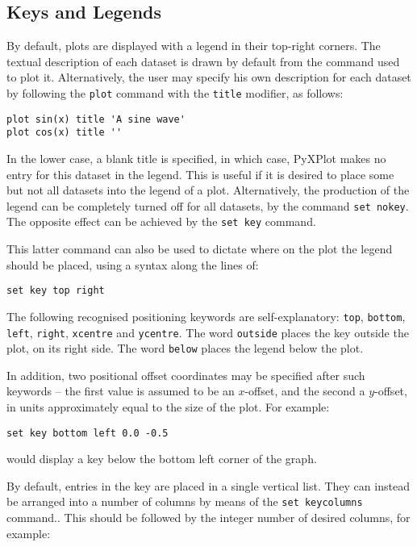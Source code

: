 \documentclass[a4paper,onecolumn,11pt]{book}
\begin{document}
\subsection{Keys and Legends}

By default, plots are displayed with a legend in their top-right corners. The
textual description of each dataset is drawn by default from the command used
to plot it. Alternatively, the user may specify his own description for each
dataset by following the \texttt{plot} command with the \texttt{title}
modifier, as follows:

\begin{verbatim}
plot sin(x) title 'A sine wave'
plot cos(x) title ''
\end{verbatim}

In the lower case, a blank title is specified, in which case, PyXPlot makes no
entry for this dataset in the legend. This is useful if it is desired to place
some but not all datasets into the legend of a plot.  Alternatively, the
production of the legend can be completely turned off for all datasets, by the
command \texttt{set nokey}. The opposite effect can be achieved by the
\texttt{set key} command.

This latter command can also be used to dictate where on the plot the legend
should be placed, using a syntax along the lines of:

\begin{verbatim}
set key top right
\end{verbatim}

The following recognised positioning keywords are self-explanatory:
\texttt{top}, \texttt{bottom}, \texttt{left}, \texttt{right}, \texttt{xcentre}
and \texttt{ycentre}. The word \texttt{outside} places the key outside the
plot, on its right side. The word \texttt{below} places the legend below the
plot.

In addition, two positional offset coordinates may be specified after such
keywords -- the first value is assumed to be an $x$-offset, and the second a
$y$-offset, in units approximately equal to the size of the plot. For example:

\begin{verbatim}
set key bottom left 0.0 -0.5
\end{verbatim}

\noindent would display a key below the bottom left corner of the graph.

By default, entries in the key are placed in a single vertical list. They can
instead be arranged into a number of columns by means of the \texttt{set
keycolumns} command.. This should be followed by the integer number of desired columns, for
example:
\end{document}
